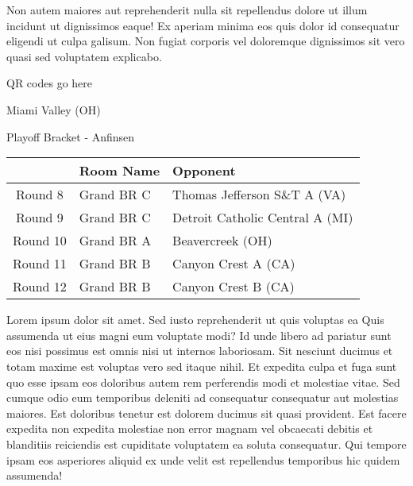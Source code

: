 \documentclass{article}%
\begin{document}
\newline%
Non autem maiores aut reprehenderit nulla sit repellendus dolore ut illum incidunt ut dignissimos eaque! Ex aperiam minima eos quis dolor id consequatur eligendi ut culpa galisum. Non fugiat corporis vel doloremque dignissimos sit vero quasi sed voluptatem explicabo.\newline%
\newline%
%
\vspace*{30pt}%
\begin{center}%
\begin{Huge}%
QR codes go here%
\end{Huge}%
\end{center}%
\newpage%
\begin{center}%
\begin{Huge}%
Miami Valley (OH)%
\end{Huge}%
\vspace*{8pt}%
\linebreak%
\begin{Large}%
Playoff Bracket {-} Anfinsen%
\end{Large}%
\end{center}%
\begin{tabularx}{\textwidth}{|c|Y|Y|}%
\hline%
&Room Name&Opponent\\%
\hline%
Round 8&Grand BR C&Thomas Jefferson S\&T A (VA)\\%
Round 9&Grand BR C&Detroit Catholic Central A (MI)\\%
Round 10&Grand BR A&Beavercreek (OH)\\%
Round 11&Grand BR B&Canyon Crest A (CA)\\%
Round 12&Grand BR B&Canyon Crest B (CA)\\%
\hline%
\end{tabularx}%
\vspace*{8pt}%
\linebreak%
\newline%
\newline%
Lorem ipsum dolor sit amet. Sed iusto reprehenderit ut quis voluptas ea Quis assumenda ut eius magni eum voluptate modi? Id unde libero ad pariatur sunt eos nisi possimus est omnis nisi ut internos laboriosam. Sit nesciunt ducimus et totam maxime est voluptas vero sed itaque nihil. Et expedita culpa et fuga sunt quo esse ipsam eos doloribus autem rem perferendis modi et molestiae vitae.\newline%
\newline%
Sed cumque odio eum temporibus deleniti ad consequatur consequatur aut molestias maiores. Est doloribus tenetur est dolorem ducimus sit quasi provident. Est facere expedita non expedita molestiae non error magnam vel obcaecati debitis et blanditiis reiciendis est cupiditate voluptatem ea soluta consequatur. Qui tempore ipsam eos asperiores aliquid ex unde velit est repellendus temporibus hic quidem assumenda!\newline%
\end{document}
